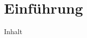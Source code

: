 \section{Einführung}

%

\begin{frame}{Inhalt}
    \thispagestyle{empty}
    \tableofcontents
\end{frame}